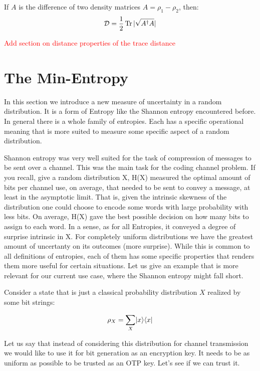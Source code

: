 \begin{theorem}[]
	If $A$ is the difference of two density matrices $A = \rho_1 - \rho_2$, then:
	\begin{equation}
		\mathcal{D} = \frac{1}{2} \operatorname{Tr} |\sqrt{A^{\dagger}A}|
	\end{equation}
\end{theorem}

\textcolor{red}{Add section on distance properties of the trace distance}


\section{The Min-Entropy}

In this section we introduce a new measure of uncertainty in a random distribution. It is a form of Entropy like the Shannon entropy encountered before.
In general there is a whole family of entropies. Each has a specific operational meaning that is more suited to measure some specific aspect of a random distribution.

Shannon entropy was very well suited for the task of compression of messages to be sent over a channel. This was the main task for the coding channel problem. If you recall, give a random distribution X,  H(X) measured the optimal amount of bits per channel use, on average, that needed to be sent to convey a message, at least in the asymptotic limit. That is, given the intrinsic skewness of the distribution one could choose to encode some words with large probability with less bits. On average, H(X) gave the best possible decision on how many bits to assign to each word. In a sense, as for all Entropies, it conveyed a degree of surprise intrinsic in X. For completely uniform distributions we have the greatest amount of uncertanty on its outcomes (more surprise). While this is common to all definitions of entropies, each of them has some specific properties that renders them more useful for certain situations. Let us give an example that is more relevant for our current use case, where the Shannon entropy might fall short.

Consider a state that is just a classical probability distribution $X$ realized by some bit strings:

\begin{equation}
	\rho_X = \sum_X \lvert x\rangle \langle x\rvert
\end{equation}

Let us say that instead of considering this distribution for channel transmission we would like to use it for bit generation as an encryption key. It needs to be as uniform as possible to be trusted as an OTP key. Let's see if we can trust it.

